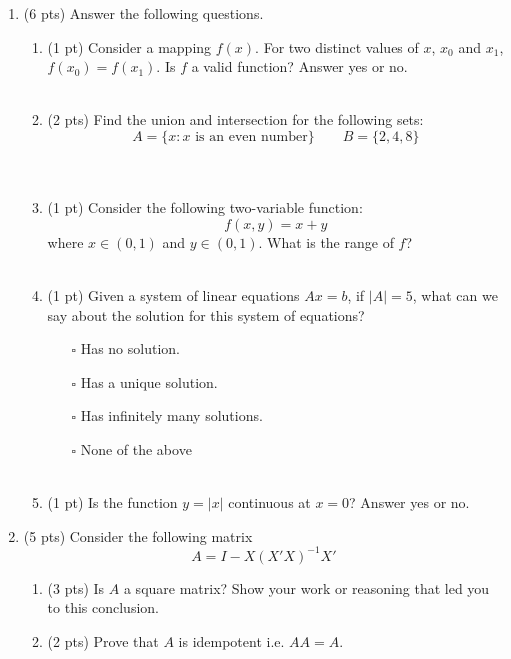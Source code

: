 \documentclass{./../../Latex/tests}
\begin{document}
\thispagestyle{plain}

\vspace{0.5em}

\begin{enumerate}
\item (6 pts) Answer the following questions. 
\begin{enumerate}
\item (1 pt) Consider a mapping $f(x)$. For two distinct values of $x$, $x_0$ and $x_1$, $f(x_0) = f(x_1)$. Is $f$ a valid function? Answer yes or no. \\~\\
\item (2 pts) Find the union and intersection for the following sets:
$$ A = \{x: x \text{ is an even number} \} \quad \quad B = \{2, 4, 8 \} $$ \\~\\
\item (1 pt) Consider the following two-variable function: 
  $$ f(x,y) = x+y $$
  where $x \in (0,1)$ and $y \in (0,1)$. What is the range of $f$? \\~\\
 
\item (1 pt) Given a system of linear equations $A x = b$, if $|A|=5$, what can we say about the solution for this system of equations?
\begin{itemize}
	\item[$\square$] Has no solution. 
	\item[$\square$] Has a unique solution.
	\item[$\square$] Has infinitely many solutions.
	\item[$\square$] None of the above \\~\\
\end{itemize}  
\item (1 pt) Is the function $y=|x|$ continuous at $x=0$? Answer yes or no. 
\end{enumerate} 

\newpage
\item (5 pts) Consider the following matrix $$A = I - X(X'X)^{-1}X'$$
\begin{enumerate}
\item (3 pts)  Is $A$ a square matrix? Show your work or reasoning that led you to this conclusion. \vspace{2.5cm}
\item (2 pts) Prove that $A$ is idempotent i.e. $A A = A$. \vspace{5cm}
\end{enumerate} 


\end{enumerate}
\end{document}
